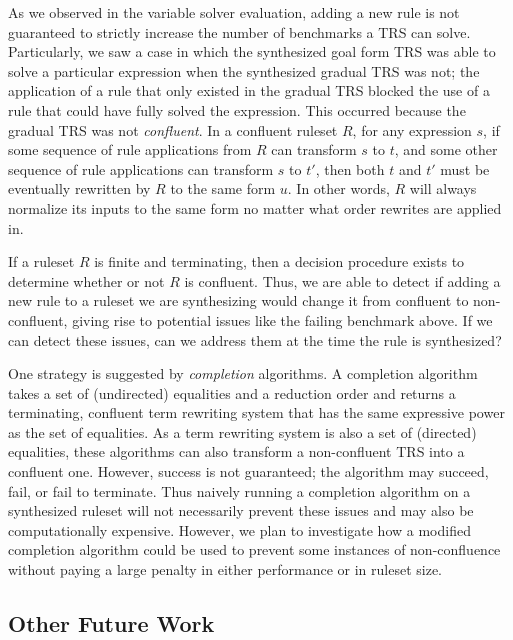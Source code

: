 As we observed in the variable solver evaluation, adding a new rule is not guaranteed to strictly increase the number of benchmarks a TRS can solve. Particularly, we saw a case in which the synthesized goal form TRS was able to solve a particular expression when the synthesized gradual TRS was not; the application of a rule that only existed in the gradual TRS blocked the use of a rule that could have fully solved the expression. This occurred because the gradual TRS was not \emph{confluent}. In a confluent ruleset $R$, for any expression $s$, if some sequence of rule applications from $R$ can transform $s$ to $t$, and some other sequence of rule applications can transform $s$ to $t'$, then both $t$ and $t'$ must be eventually rewritten by $R$ to the same form $u$. In other words, $R$ will always normalize its inputs to the same form no matter what order rewrites are applied in. 

If a ruleset $R$ is finite and terminating, then a decision procedure exists to determine whether or not $R$ is confluent. Thus, we are able to detect if adding a new rule to a ruleset we are synthesizing would change it from confluent to non-confluent, giving rise to potential issues like the failing benchmark above. If we can detect these issues, can we address them at the time the rule is synthesized?

One strategy is suggested by \emph{completion} algorithms. A completion algorithm takes a set of (undirected) equalities and a reduction order and returns a terminating, confluent term rewriting system that has the same expressive power as the set of equalities. As a term rewriting system is also a set of (directed) equalities, these algorithms can also transform a non-confluent TRS into a confluent one. However, success is not guaranteed; the algorithm may succeed, fail, or fail to terminate. Thus naively running a completion algorithm on a synthesized ruleset will not necessarily prevent these issues and may also be computationally expensive. However, we plan to investigate how a modified completion algorithm could be used to prevent some instances of non-confluence without paying a large penalty in either performance or in ruleset size.

\subsection{Other Future Work}

